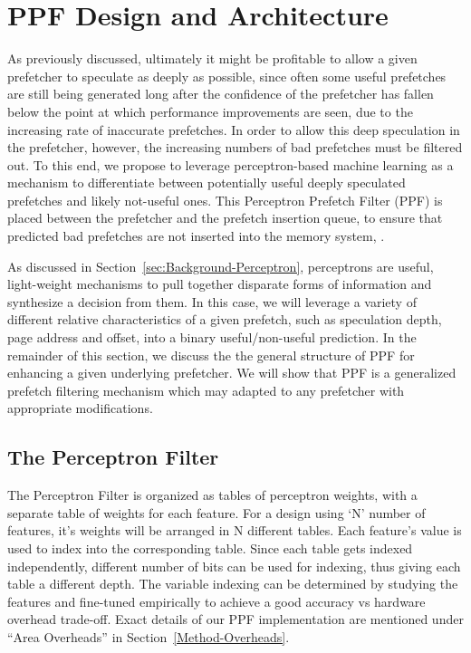 \section{PPF Design and Architecture}
\label{Arch}

As previously discussed, ultimately it might be profitable to allow a
given prefetcher to speculate as deeply as possible, since often some
useful prefetches are still being generated long after the confidence
of the prefetcher has fallen below the point at which performance
improvements are seen, due to the increasing rate of inaccurate
prefetches.  In order to allow this deep speculation in the
prefetcher, however, the increasing numbers of bad prefetches must be
filtered out.  To this end, we propose to leverage perceptron-based
machine learning as a mechanism to differentiate between potentially
useful deeply speculated prefetches and likely not-useful ones.  This
Perceptron Prefetch Filter (PPF) is placed between the prefetcher and
the prefetch insertion queue, to ensure that predicted bad prefetches
are not inserted into the memory system, 
.

As discussed in Section~\ref{sec:Background-Perceptron}, perceptrons
are useful, light-weight mechanisms to pull together disparate forms
of information and synthesize a decision from them.  In this case, we
will leverage a variety of different relative characteristics of a
given prefetch, such as speculation depth, page address and offset,
into a binary useful/non-useful prediction.  In the remainder of this
section, we discuss the the general structure of PPF for enhancing a
given underlying prefetcher.  We will show that PPF is a generalized
prefetch filtering mechanism which may adapted to any prefetcher with
appropriate modifications.

\subsection{The Perceptron Filter}
\label{Arch-Perceptron}

The Perceptron Filter is organized as tables of perceptron weights,
with a separate table of weights for each feature. For a design using 
`N' number of features, it's weights will be arranged in N different 
tables. Each feature's value is used to index into the corresponding table.
Since each table gets indexed independently, different number of bits can 
be used for indexing, thus giving each table a different depth.
The variable indexing can be determined by studying the features and
fine-tuned empirically to achieve a good accuracy vs hardware overhead
trade-off.  Exact details of our PPF implementation are mentioned 
under ``Area Overheads'' in Section~\ref{Method-Overheads}.
 

